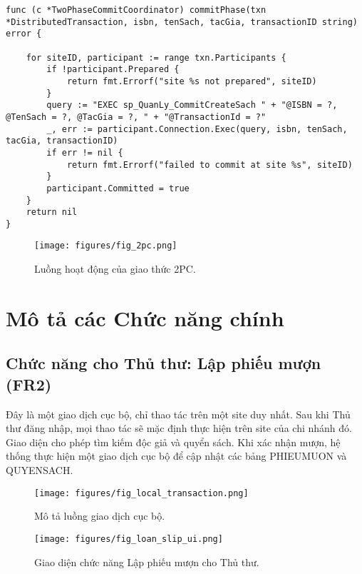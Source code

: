 \documentclass[conference]{IEEEtran}
\begin{document}
\begin{Verbatim}[fontsize=\footnotesize,breaklines=true,breakanywhere=true]
func (c *TwoPhaseCommitCoordinator) commitPhase(txn *DistributedTransaction, isbn, tenSach, tacGia, transactionID string) error {
    
    for siteID, participant := range txn.Participants {
        if !participant.Prepared {
            return fmt.Errorf("site %s not prepared", siteID)
        }
        query := "EXEC sp_QuanLy_CommitCreateSach " + "@ISBN = ?, @TenSach = ?, @TacGia = ?, " + "@TransactionId = ?"
        _, err := participant.Connection.Exec(query, isbn, tenSach, tacGia, transactionID)
        if err != nil {
            return fmt.Errorf("failed to commit at site %s", siteID)
        }
        participant.Committed = true
    }
    return nil
}
\end{Verbatim}

\begin{figure}[!h]
\centering
\texttt{[image: figures/fig\_2pc.png]} 
\caption{Luồng hoạt động của giao thức 2PC.}
\label{fig_2pc}
\end{figure}

\section{Mô tả các Chức năng chính}
\subsection{Chức năng cho Thủ thư: Lập phiếu mượn (FR2)}
Đây là một giao dịch cục bộ, chỉ thao tác trên một site duy nhất. Sau khi Thủ thư đăng nhập, mọi thao tác sẽ mặc định thực hiện trên site của chi nhánh đó. Giao diện cho phép tìm kiếm độc giả và quyển sách. Khi xác nhận mượn, hệ thống thực hiện một giao dịch cục bộ để cập nhật các bảng PHIEUMUON và QUYENSACH.

\begin{figure}[!h]
\centering
\texttt{[image: figures/fig\_local\_transaction.png]} 
\caption{Mô tả luồng giao dịch cục bộ.}
\label{fig_local_transaction}
\end{figure}

\begin{figure}[!h]
\centering
\texttt{[image: figures/fig\_loan\_slip\_ui.png]} 
\caption{Giao diện chức năng Lập phiếu mượn cho Thủ thư.}
\label{fig_loan_slip_ui}
\end{figure}
\end{document}
